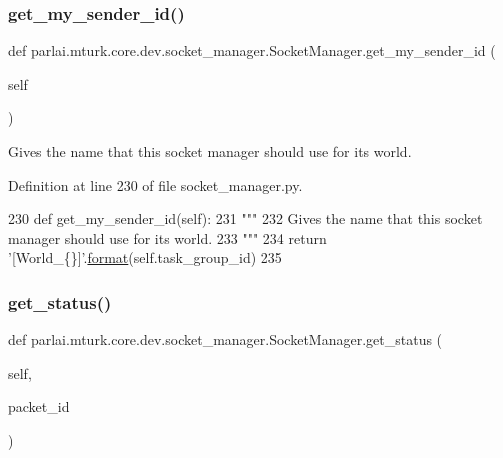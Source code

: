 \subsubsection{\texorpdfstring{get\+\_\+my\+\_\+sender\+\_\+id()}{get\_my\_sender\_id()}}
{\footnotesize\ttfamily def parlai.\+mturk.\+core.\+dev.\+socket\+\_\+manager.\+Socket\+Manager.\+get\+\_\+my\+\_\+sender\+\_\+id (\begin{DoxyParamCaption}\item[{}]{self }\end{DoxyParamCaption})}

\begin{DoxyVerb}Gives the name that this socket manager should use for its world.
\end{DoxyVerb}
 

Definition at line 230 of file socket\+\_\+manager.\+py.


\begin{DoxyCode}
230     \textcolor{keyword}{def }get\_my\_sender\_id(self):
231         \textcolor{stringliteral}{"""}
232 \textcolor{stringliteral}{        Gives the name that this socket manager should use for its world.}
233 \textcolor{stringliteral}{        """}
234         \textcolor{keywordflow}{return} \textcolor{stringliteral}{'[World\_\{\}]'}.\hyperlink{namespaceparlai_1_1chat__service_1_1services_1_1messenger_1_1shared__utils_a32e2e2022b824fbaf80c747160b52a76}{format}(self.task\_group\_id)
235 
\end{DoxyCode}
\mbox{\label{classparlai_1_1mturk_1_1core_1_1dev_1_1socket__manager_1_1SocketManager_afc9c7c9efb6fe26e981902f6c02557ee}} 
\subsubsection{\texorpdfstring{get\+\_\+status()}{get\_status()}}
{\footnotesize\ttfamily def parlai.\+mturk.\+core.\+dev.\+socket\+\_\+manager.\+Socket\+Manager.\+get\+\_\+status (\begin{DoxyParamCaption}\item[{}]{self,  }\item[{}]{packet\+\_\+id }\end{DoxyParamCaption})}

